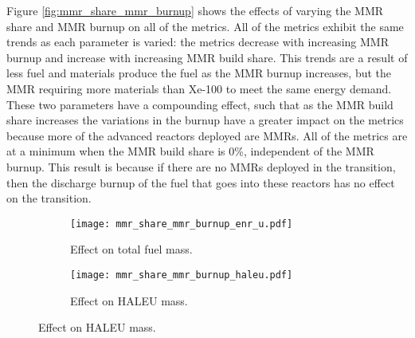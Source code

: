 Figure \ref{fig:mmr_share_mmr_burnup} shows the effects of varying 
the \gls{MMR} share and \gls{MMR} burnup on all of the metrics. All of 
the metrics exhibit the same trends as each parameter is varied: the 
metrics decrease with increasing \gls{MMR} burnup and increase 
with increasing \gls{MMR} build share. This trends are a result of 
less fuel and materials produce the fuel as the \gls{MMR} burnup increases, 
but the \gls{MMR} requiring more materials than Xe-100 to meet the same 
energy demand. These two parameters have a 
compounding effect, such that as the \gls{MMR} build share increases 
the variations in the burnup have a greater impact on the metrics because 
more of the advanced reactors deployed are \glspl{MMR}. All of the metrics 
are at a minimum when the \gls{MMR} build share is 0\%, independent of 
the \gls{MMR} burnup. This result is because if there are no \glspl{MMR} 
deployed in the transition, then the discharge burnup of the fuel that 
goes into these reactors has no effect on the transition. 


\begin{figure}
    \begin{subfigure}[t]{0.48\textwidth}
        \centering
        \texttt{[image: mmr\_share\_mmr\_burnup\_enr\_u.pdf]}
        \caption{Effect on total fuel mass.}
        \label{fig:mmr_share_mmr_burnup_enr_u}
    \end{subfigure}
    \hfill
    \begin{subfigure}[t]{0.48\textwidth}
        \centering
        \texttt{[image: mmr\_share\_mmr\_burnup\_haleu.pdf]}
        \caption{Effect on HALEU mass.}
        \label{fig:mmr_share_mmr_burnup_haleu}
    \end{subfigure}
\end{figure}

